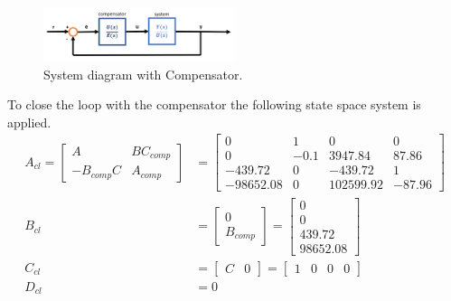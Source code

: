 \documentclass[11pt]{article}
\begin{document}
\begin{enumerate}[label=\textbf{\arabic*.}]
  \begin{figure}[H]
    \centering
    \includegraphics[width=0.5\textwidth]{p4-1.png}
    \caption{System diagram with Compensator.}
  \end{figure}

  To close the loop with the compensator the following state space system is 
  applied.
  \begin{equation}
    \begin{split}
      A_{cl} =
      \begin{bmatrix}
        A & BC_{comp} \\ -B_{comp}C & A_{comp}
      \end{bmatrix} 
      &=
      \begin{bmatrix}
        0 & 1 & 0 & 0 \\ 
        0 & -0.1 & 3947.84 & 87.86 \\ 
        -439.72 & 0 & -439.72 & 1 \\
        -98652.08 & 0 & 102599.92 & -87.96
      \end{bmatrix} \\
      B_{cl} &= 
      \begin{bmatrix}
        0 \\ B_{comp}
      \end{bmatrix} 
      =
      \begin{bmatrix}
        0 \\ 0 \\ 439.72 \\ 98652.08
      \end{bmatrix} \\
      C_{cl} &=
      \begin{bmatrix}
        C & 0
      \end{bmatrix}
      =
      \begin{bmatrix}
        1 & 0 & 0 & 0
      \end{bmatrix} \\
      D_{cl} &= 0
    \end{split}
  \end{equation}


\end{enumerate}
\end{document}

